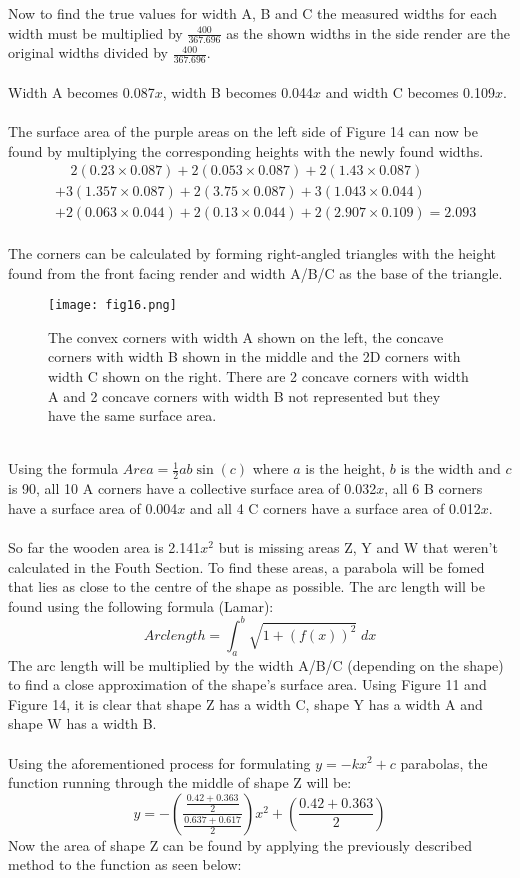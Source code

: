 \documentclass[a4paper,12pt]{article}
\begin{document}
Now to find the true values for width A, B and C the measured widths for each width must be multiplied by $\frac{400}{367.696}$ as the shown widths in the side render are the original widths divided by $\frac{400}{367.696}$. \\\\Width A becomes 0.087$x$, width B becomes 0.044$x$ and width C becomes 0.109$x$.\\\\The surface area of the purple areas on the left side of Figure 14 can now be found by multiplying the corresponding heights with the newly found widths.
\begin{equation}
\begin{aligned} 
&\;\;\;\;2(0.23\times0.087)+2(0.053\times0.087)+2(1.43\times0.087)\\&+3(1.357\times0.087)+2(3.75\times0.087)+3(1.043\times0.044)\\&+2(0.063\times0.044)+2(0.13\times0.044)+2(2.907\times0.109)=2.093
\end{aligned}
\end{equation}
\\The corners can be calculated by forming right-angled triangles with the height found from the front facing render and width A/B/C as the base of the triangle.
\begin{figure}[h!]
\centering
\texttt{[image: fig16.png]}
\caption{The convex corners with width A shown on the left, the concave corners with width B shown in the middle and the 2D corners with width C shown on the right. There are 2 concave corners with width A and 2 concave corners with width B not represented but they have the same surface area. }
\label{fig:clock16}
\end{figure}
\\Using the formula $Area=\frac{1}{2}ab\sin(c)$ where $a$ is the height, $b$ is the width and $c$ is 90\degree, all 10 A corners have a collective surface area of 0.032$x$, all 6 B corners have a surface area of 0.004$x$ and all 4 C corners have a surface area of 0.012$x$.\\\\So far the wooden area is 2.141$x^2$ but is missing areas Z, Y and W that weren't calculated in the Fouth Section. To find these areas, a parabola will be fomed that lies as close to the centre of the shape as possible. The arc length will be found using the following formula (Lamar): $$Arc length=\int_{a}^{b}{\sqrt{1+(f(x))^2}}\;dx$$ The arc length will be multiplied by the width A/B/C (depending on the shape) to find a close approximation of the shape's surface area. Using Figure 11 and Figure 14, it is clear that shape Z has a width C, shape Y has a width A and shape W has a width B. \\\\Using the aforementioned process for formulating $y=-kx^2+c$ parabolas, the function running through the middle of shape Z will be: $$y=-(\frac{\frac{0.42+0.363}{2}}{\frac{0.637+0.617}{2}})x^2+(\frac{0.42+0.363}{2})$$ Now the area of shape Z can be found by applying the previously described method to the function as seen below: 
\end{document}
